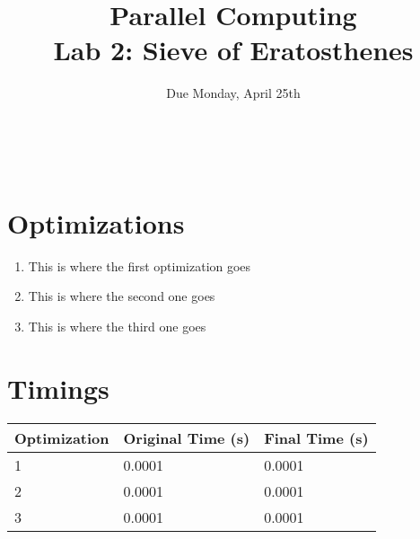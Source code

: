 \documentclass[12pt]{article}
\title{ Parallel Computing \\ Lab 2: Sieve of Eratosthenes }
\author{\MyFullName}
\date{ Due Monday, April 25th }
\begin{document}
\maketitle
\thispagestyle{empty}
\begin{center}
\end{center}
\setcounter{page}{0}
\newpage

\def\thesection{\Roman{section}.}
\hfill \\
\section{ Optimizations }
\begin{enumerate}[1.]

\item This is where the first optimization goes

\item This is where the second one goes

\item This is where the third one goes
\end{enumerate}

\section { Timings}


\begin{center}
    \begin{tabular}{ | l | l | l |}
	\hline
   	Optimization & Original Time (s) & Final Time (s) \\ \hline
    	1 & 0.0001 & 0.0001 \\ \hline
	2 & 0.0001 & 0.0001 \\ \hline
	3 & 0.0001 & 0.0001 \\  \hline
    \end{tabular}
\end{center}
\end{document}
